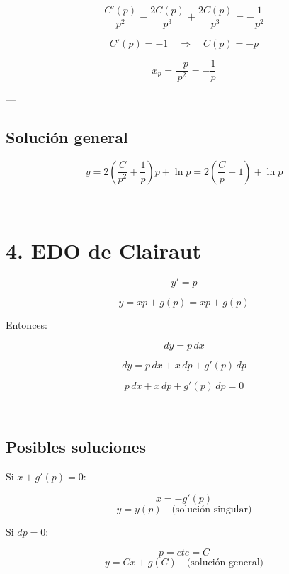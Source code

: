 \documentclass[a4paper,12pt]{article}
\begin{document}
\[
\frac{C'(p)}{p^2} - \frac{2C(p)}{p^3} + \frac{2C(p)}{p^3} = -\frac{1}{p^2}
\]

\[
C'(p) = -1 \quad \Rightarrow \quad C(p) = -p
\]

\[
x_p = \frac{-p}{p^2} = -\frac{1}{p}
\]

---

\subsection*{Solución general}

\[
y = 2 \left( \frac{C}{p^2} + \frac{1}{p} \right) p + \ln p = 2 \left( \frac{C}{p} + 1 \right) + \ln p
\]

---

\section*{4. EDO de Clairaut}

\[
y' = p
\]

\[
y = xp + g(p) = xp + g(p)
\]

Entonces:

\[
dy = p\, dx
\]

\[
dy = p\, dx + x\, dp + g'(p)\, dp
\]

\[
p\, dx + x\, dp + g'(p)\, dp = 0
\]

---

\subsection*{Posibles soluciones}

\quad Si \( x + g'(p) = 0 \):

\[
x = -g'(p)
\]
\[
y = y(p) \quad \text{(solución singular)}
\]

\quad Si \( dp = 0 \):

\[
p = cte = C
\]
\[
y = Cx + g(C) \quad \text{(solución general)}
\]
\end{document}
